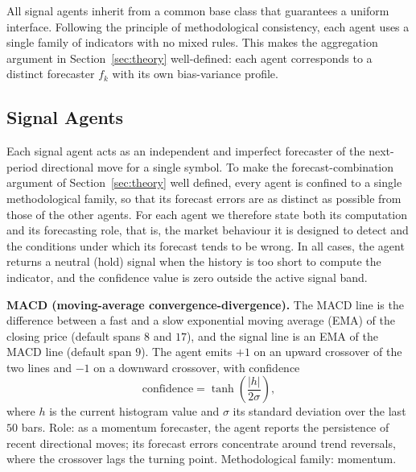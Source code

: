 \documentclass{ieeeaccess}
\begin{document}
All signal agents inherit from a common base class that guarantees a uniform interface. Following the principle of methodological consistency, each agent uses a single family of indicators with no mixed rules. This makes the aggregation argument in Section~\ref{sec:theory} well-defined: each agent corresponds to a distinct forecaster $f_k$ with its own bias-variance profile.

\subsection{Signal Agents}

Each signal agent acts as an independent and imperfect forecaster of the next-period directional move for a single symbol. To make the forecast-combination argument of Section~\ref{sec:theory} well defined, every agent is confined to a single methodological family, so that its forecast errors are as distinct as possible from those of the other agents. For each agent we therefore state both its computation and its forecasting role, that is, the market behaviour it is designed to detect and the conditions under which its forecast tends to be wrong. In all cases, the agent returns a neutral (hold) signal when the history is too short to compute the indicator, and the confidence value is zero outside the active signal band.

\textbf{MACD (moving-average convergence-divergence).} The MACD line is the difference between a fast and a slow exponential moving average (EMA) of the closing price (default spans $8$ and $17$), and the signal line is an EMA of the MACD line (default span $9$). The agent emits $+1$ on an upward crossover of the two lines and $-1$ on a downward crossover, with confidence
\begin{equation}
\mathrm{confidence} = \tanh\!\left(\frac{|h|}{2\sigma}\right),
\end{equation}
where $h$ is the current histogram value and $\sigma$ its standard deviation over the last $50$ bars. Role: as a momentum forecaster, the agent reports the persistence of recent directional moves; its forecast errors concentrate around trend reversals, where the crossover lags the turning point. Methodological family: momentum.
\end{document}

